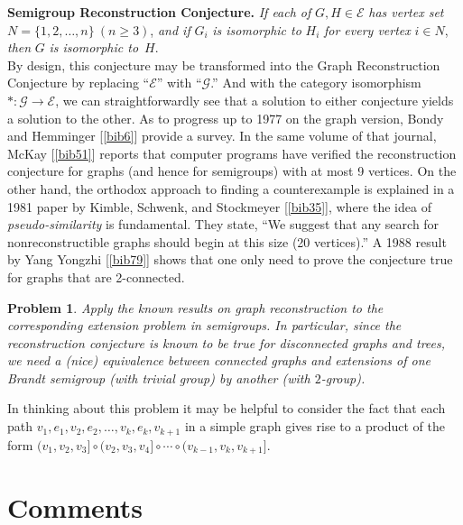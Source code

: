 \documentclass{surv-l}
\numberwithin{equation}{section}
\numberwithin{table}{section}
\numberwithin{figure}{section}
\theoremstyle{plain}
\newtheorem{problem}[equation]{Problem}
\theoremstyle{definition}
\begin{document}
\noindent \textbf{Semigroup Reconstruction Conjecture.} \emph{If each
of} $G, H\in \mathcal{E}$ \emph{has vertex set} $N=\{1,2,\ldots,
n\}\ (n\geq 3)$, \emph{and if} $G_{i}$ \emph{is isomorphic to}
$H_{i}$ \emph{for every vertex} $i\in N$, \emph{then} $G$ \emph{is
isomorphic to}~$H$.\\

By design, this conjecture may be transformed into the Graph
Reconstruction Conjecture by replacing ``$\mathcal{E}$'' with
``$\mathcal{G}$.'' And with the category isomorphism
$*:\mathcal{G}\rightarrow \mathcal{E}$, we can straightforwardly
see that a solution to either conjecture yields a solution to the
other. As to progress up to 1977 on the graph version, Bondy and
Hemminger [\ref{bib6}]
provide a survey. In the same volume of that journal,
McKay [\ref{bib51}] reports
that computer programs have verified the reconstruction conjecture
for graphs (and hence for semigroups) with at most 9 vertices. On
the other hand, the orthodox approach to finding a counterexample
is explained in a 1981 paper by Kimble, Schwenk, and Stockmeyer
[\ref{bib35}], where the idea of
\emph{pseudo-similarity} is fundamental. They state, ``We suggest
that any search for nonreconstructible graphs should begin at this
size (20 vertices).'' A 1988 result by Yang Yongzhi [\ref{bib79}] shows that one only need to
prove the conjecture true for graphs that are 2-connected.

\begin{problem}\label{prob13.68.1}
Apply the known results on graph reconstruction to the
corresponding extension problem in semigroups. In particular,
since the reconstruction conjecture is known to be true for
disconnected graphs and trees, we need a (nice) equivalence
between connected graphs and extensions of one Brandt semigroup
(with trivial group) by another (with $2$-group).
\end{problem}

In thinking about this problem it may be helpful to consider
the fact that each path $v_{1},e_{1},v_{2},e_{2},\ldots,v_{k},
e_{k},v_{k+1}$ in a simple graph gives rise to a product of
the form $(v_{1},v_{2},v_{3}]\circ (v_{2}, v_3, v_{4}]\circ\cdots
\circ (v_{k-1}, v_{k}, v_{k+1}]$.

\section{Comments}\label{sec13.69}
\end{document}

